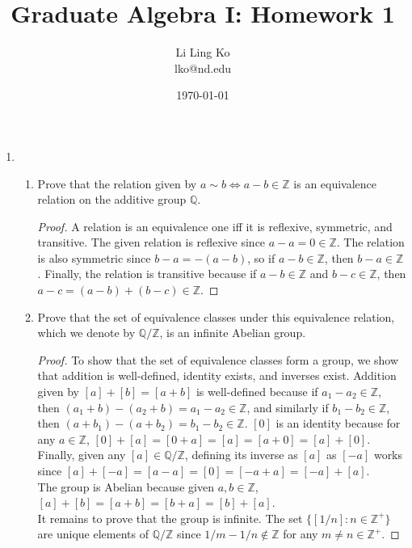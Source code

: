 \documentclass{article}
\begin{document}
\title{Graduate Algebra I: Homework 1}
\author{Li Ling Ko\\ lko@nd.edu}
\date{\today}
\maketitle

\begin{enumerate}
  \item
    \begin{enumerate}
      \item Prove that the relation given by $a \sim b \Longleftrightarrow
        a-b \in \mathbb{Z} $ is an equivalence relation on the additive group
        $\mathbb{Q}$.
        \begin{proof}
          A relation is an equivalence one iff it is reflexive, symmetric,
          and transitive. The given relation is reflexive since
          $a-a=0\in\mathbb{Z}$. The relation is also symmetric since
          $b-a=-(a-b)$, so if $a-b\in\mathbb{Z}$, then $b-a\in\mathbb{Z}$.
          Finally, the relation is transitive because if $a-b\in\mathbb{Z}$
          and $b-c\in\mathbb{Z}$, then $a-c=(a-b)+(b-c)\in\mathbb{Z}$.
        \end{proof}
      \item Prove that the set of equivalence classes under this equivalence
        relation, which we denote by $\mathbb{Q}/\mathbb{Z}$, is an infinite
        Abelian group.
        \begin{proof}
          To show that the set of equivalence classes form a group, we show
          that addition is well-defined, identity exists, and inverses exist.
          Addition given by $[a]+[b]=[a+b]$ is well-defined because if
          $a_1-a_2\in\mathbb{Z}$, then
          $(a_1+b)-(a_2+b)=a_1-a_2\in\mathbb{Z}$, and similarly if
          $b_1-b_2\in\mathbb{Z}$, then
          $(a+b_1)-(a+b_2)=b_1-b_2\in\mathbb{Z}$.
          $[0]$ is an identity because for any $a\in\mathbb{Z}$,
          $[0]+[a]=[0+a]=[a]=[a+0]=[a]+[0]$. Finally, given any
          $[a]\in\mathbb{Q}/\mathbb{Z}$, defining its inverse as $[a]$ as
          $[-a]$ works since $[a]+[-a]=[a-a]=[0]=[-a+a]=[-a]+[a]$. \\

          The group is Abelian because given $a,b\in\mathbb{Z}$,
          $[a]+[b]=[a+b]=[b+a]=[b]+[a]$. \\

          It remains to prove that the group is infinite. The set
          $\{[1/n]:n\in\mathbb{Z}^+\}$ are unique elements of
          $\mathbb{Q}/\mathbb{Z}$ since $1/m-1/n\notin\mathbb{Z}$ for any
          $m\neq n\in\mathbb{Z}^+$.
        \end{proof}
    \end{enumerate}


\end{enumerate}
\end{document}
